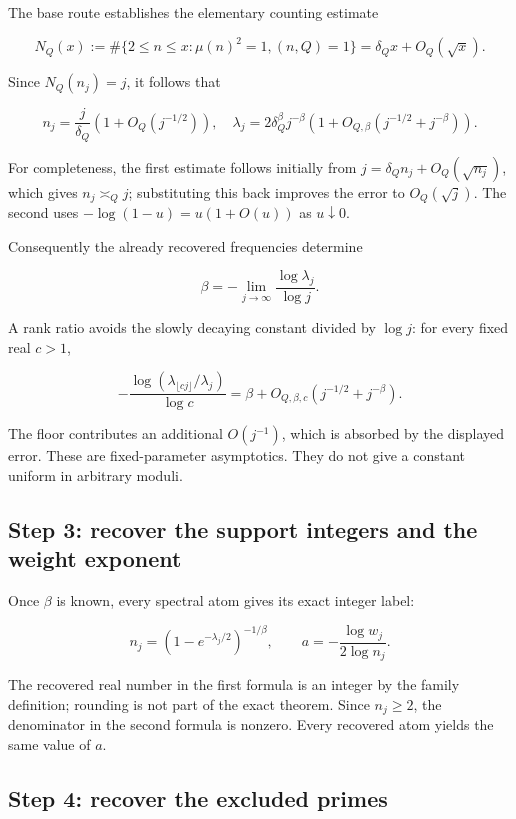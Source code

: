 The base route establishes the elementary counting estimate

\[
 N_Q(x):=\#\{2\le n\le x:\mu(n)^2=1,(n,Q)=1\}
       =\delta_Qx+O_Q(\sqrt{x}).
\]

Since \(N_Q(n_j)=j\), it follows that

\[
 n_j=\frac{j}{\delta_Q}\left(1+O_Q(j^{-1/2})\right),
 \quad
 \lambda_j=2\delta_Q^{\beta}j^{-\beta}
     \left(1+O_{Q,\beta}(j^{-1/2}+j^{-\beta})\right).
\]

For completeness, the first estimate follows initially from
\(j=\delta_Qn_j+O_Q(\sqrt{n_j})\), which gives \(n_j\asymp_Qj\);
substituting this back improves the error to \(O_Q(\sqrt j)\). The
second uses \(-\log(1-u)=u(1+O(u))\) as \(u\downarrow0\).

Consequently the already recovered frequencies determine

\[
 \boxed{\displaystyle
 \beta=-\lim_{j\to\infty}\frac{\log\lambda_j}{\log j}.}
\]

A rank ratio avoids the slowly decaying constant divided by \(\log j\):
for every fixed real \(c>1\),

\[
 -\frac{\log(\lambda_{\lfloor cj\rfloor}/\lambda_j)}{\log c}
 =\beta+O_{Q,\beta,c}(j^{-1/2}+j^{-\beta}).
\]

The floor contributes an additional \(O(j^{-1})\), which is absorbed by
the displayed error. These are fixed-parameter asymptotics. They do not
give a constant uniform in arbitrary moduli.

\hypertarget{step-3-recover-the-support-integers-and-the-weight-exponent}{%
\subsection{Step 3: recover the support integers and the weight
exponent}\label{step-3-recover-the-support-integers-and-the-weight-exponent}}

Once \(\beta\) is known, every spectral atom gives its exact integer
label:

\[
 \boxed{\displaystyle
 n_j=(1-e^{-\lambda_j/2})^{-1/\beta},\qquad
 a=-\frac{\log w_j}{2\log n_j}.}
\]

The recovered real number in the first formula is an integer by the
family definition; rounding is not part of the exact theorem. Since
\(n_j\ge2\), the denominator in the second formula is nonzero. Every
recovered atom yields the same value of \(a\).

\hypertarget{step-4-recover-the-excluded-primes}{%
\subsection{Step 4: recover the excluded
primes}\label{step-4-recover-the-excluded-primes}}

